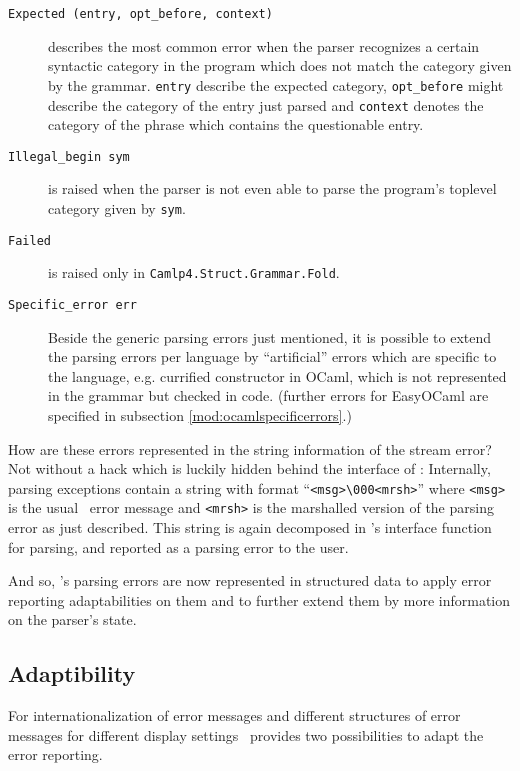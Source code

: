 \begin{description}
    \item[\texttt{Expected~(entry,~opt\_before,~context)}] describes the most
      common error when the parser recognizes a certain syntactic category in
      the program which does not match the category given by the grammar.
      \texttt{entry} describe the expected category, \texttt{opt\_before} might
      describe the category of the entry just parsed and \texttt{context}
      denotes the category of the phrase which contains the questionable entry.
    \item[\texttt{Illegal\_begin~sym}] is raised when the parser is 
      not even able to parse the program's toplevel category given by \texttt{sym}.
    \item[\texttt{Failed}] is raised only in 
      \texttt{Camlp4.Struct.Grammar.Fold}.
    \item[\texttt{Specific\_error~err}] Beside the generic parsing 
      errors just mentioned, it is possible to extend the parsing errors per
      language by ``artificial'' errors which are specific to the language, e.g.
      currified constructor in OCaml, which is not represented in the grammar
      but checked in code.  (further errors for EasyOCaml are specified in
      subsection \ref{mod:ocamlspecificerrors}.)
\end{description}

How are these errors represented in the string information of the stream error?
Not without a hack which is luckily hidden behind the interface of \camlpf:
Internally, parsing exceptions contain a string with format
``\texttt{<msg>\textbackslash 000<mrsh>}'' where \texttt{<msg>} is
the usual \camlpf\ error message and \texttt{<mrsh>} is the marshalled version
of the parsing error as just described.
This string is again decomposed in \camlpf's interface function for
parsing, and
reported as a parsing error to the user.

And so, \camlpf's parsing errors are now represented in structured data to
apply error reporting adaptabilities on them and to further extend them by more
information on the parser's state.

\subsection{Adaptibility}

For internationalization of error messages and different structures of error
messages for different display settings \easyocaml\ provides two possibilities
to adapt the error reporting.

